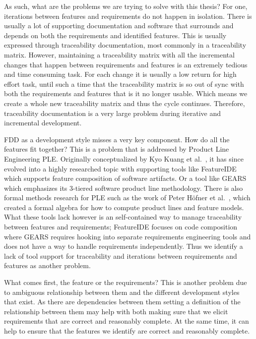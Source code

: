 As such, what are the problems we are trying to solve with this thesis? For one, iterations between features and requirements do not happen in isolation. There is usually a lot of supporting documentation and software that surrounds and depends on both the requirements and identified features. This is usually expressed through traceability documentation, most commonly in a traceability matrix. However, maintaining a traceability matrix with all the incremental changes that happen between requirements and features is an extremely tedious and time consuming task. For each change it is usually a low return for high effort task, until such a time that the traceability matrix is so out of sync with both the requirements and features that is it no longer usable. Which means we create a whole new traceability matrix and thus the cycle continues. Therefore, traceability documentation is a very large problem during iterative and incremental development.

\ac{FDD} as a development style misses a very key component. How do all the features fit together? This is a problem that is addressed by Product Line Engineering \ac{PLE}. Originally conceptualized by Kyo Kuang et al.~\cite{kang1990feature, kang1998form}, it has since evolved into a highly researched topic with supporting tools like FeatureIDE~\cite{kastner2009featureide, thum2014featureide} which supports feature composition of software artifacts. Or a tool like GEARS~\cite{GEARS} which emphasizes its 3-tiered software product line methodology. There is also formal methods research for \ac{PLE} such as the work of Peter H\"{o}fner et al.~\cite{hofner2006feature,hofner2011algebra}, which created a formal algebra for how to compute product lines and feature models. What these tools lack however is an self-contained way to manage traceability between features and requirements; FeatureIDE focuses on code composition where GEARS requires hooking into separate requirements engineering tools and does not have a way to handle requirements independently. Thus we identify a lack of tool support for traceability and iterations between requirements and features as another problem.

What comes first, the feature or the requirements? This is another problem due to ambiguous relationship between them and the different development styles that exist. As there are dependencies between them setting a definition of the relationship between them may help with both making sure that we elicit requirements that are correct and reasonably complete. At the same time, it can help to ensure that the features we identify are correct and reasonably complete.

